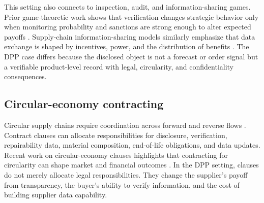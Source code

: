 \documentclass[final,5p,times,authoryear]{elsarticle}
\begin{document}
This setting also connects to inspection, audit, and information-sharing games. Prior game-theoretic work shows that verification changes strategic behavior only when monitoring probability and sanctions are strong enough to alter expected payoffs \citep{doi162583122023226544,doi002075432019168113}. Supply-chain information-sharing models similarly emphasize that data exchange is shaped by incentives, power, and the distribution of benefits \citep{doi002075432021192517,doijournalpone0298355}. The DPP case differs because the disclosed object is not a forecast or order signal but a verifiable product-level record with legal, circularity, and confidentiality consequences.

\subsection{Circular-economy contracting}

Circular supply chains require coordination across forward and reverse flows \citep{deangelis2018circular,govindan2015reverse}. Contract clauses can allocate responsibilities for disclosure, verification, repairability data, material composition, end-of-life obligations, and data updates. Recent work on circular-economy clauses highlights that contracting for circularity can shape market and financial outcomes \citep{castrolopez2026contracting}. In the DPP setting, clauses do not merely allocate legal responsibilities. They change the supplier's payoff from transparency, the buyer's ability to verify information, and the cost of building supplier data capability.
\end{document}
